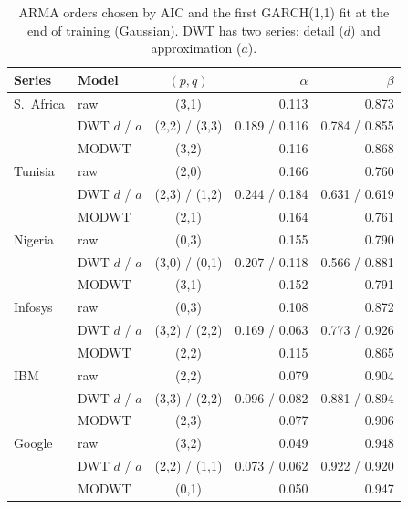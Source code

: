 \documentclass{article}
\begin{document}
\begin{table}[t]
\caption{ARMA orders chosen by AIC and the first GARCH(1,1) fit at the end of training (Gaussian). DWT has two series: detail ($d$) and approximation ($a$).}
\label{tab:orders}
\centering\small
\setlength{\tabcolsep}{3pt}
\begin{tabular}{llcrr}
\toprule
Series & Model & $(p,q)$ & $\alpha$ & $\beta$\\
\midrule
S.\ Africa & raw & (3,1) & 0.113 & 0.873\\
 & DWT $d$ / $a$ & (2,2) / (3,3) & 0.189 / 0.116 & 0.784 / 0.855\\
 & MODWT & (3,2) & 0.116 & 0.868\\
Tunisia & raw & (2,0) & 0.166 & 0.760\\
 & DWT $d$ / $a$ & (2,3) / (1,2) & 0.244 / 0.184 & 0.631 / 0.619\\
 & MODWT & (2,1) & 0.164 & 0.761\\
Nigeria & raw & (0,3) & 0.155 & 0.790\\
 & DWT $d$ / $a$ & (3,0) / (0,1) & 0.207 / 0.118 & 0.566 / 0.881\\
 & MODWT & (3,1) & 0.152 & 0.791\\
Infosys & raw & (0,3) & 0.108 & 0.872\\
 & DWT $d$ / $a$ & (3,2) / (2,2) & 0.169 / 0.063 & 0.773 / 0.926\\
 & MODWT & (2,2) & 0.115 & 0.865\\
IBM & raw & (2,2) & 0.079 & 0.904\\
 & DWT $d$ / $a$ & (3,3) / (2,2) & 0.096 / 0.082 & 0.881 / 0.894\\
 & MODWT & (2,3) & 0.077 & 0.906\\
Google & raw & (3,2) & 0.049 & 0.948\\
 & DWT $d$ / $a$ & (2,2) / (1,1) & 0.073 / 0.062 & 0.922 / 0.920\\
 & MODWT & (0,1) & 0.050 & 0.947\\
\bottomrule
\end{tabular}
\end{table}
\end{document}
